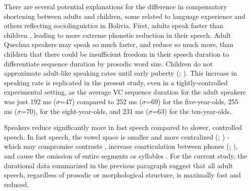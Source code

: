 \documentclass[a4paper,man,floatsintext,natbib,donotrepeattitle, apacite]{apa6}
\begin{document}
There are several potential explanations for the difference in compensatory shortening between adults and children, some related to language experience and others reflecting sociolinguistics in Bolivia. First, adults speak faster than children \citep{leeAcousticsChildrenSpeech1999}, leading to more extreme phonetic reduction in their speech. Adult Quechua speakers may speak so much faster, and reduce so much more, than children that there could be insufficient freedom in their speech duration to differentiate sequence duration by prosodic word size. Children do not approximate adult-like speaking rates until early puberty (\citealt{leeAcousticsChildrenSpeech1999}; \citealt{smithRelationshipsDurationTemporal1992}). This increase in speaking rate is replicated in the present study, even in a tightly-controlled experimental setting, as the average VC sequence duration for the adult speakers was just 192 ms ($\sigma$=47) compared to 252 ms ($\sigma$=69) for the five-year-olds, 255 ms ($\sigma$=70), for the eight-year-olds, and 231 ms ($\sigma$=63) for the ten-year-olds. 

Speakers reduce significantly more in fast speech compared to slower, controlled speech. In fast speech, the vowel space is smaller and more centralized (\citealt{fourakisTempoStressVowel1991}; \citealt{tsaoEffectIntertalkerSpeech2006}) - which may compromise contrasts \citep{koopmans-vanbeinumVowelContrastReduction1980}, increase coarticulation between phones (\citealt{agwueleEffectSpeakingRate2008}; \citealt{matthiesVariationAnticipatoryCoarticulation2001}), and cause the omission of entire segments or syllables \citep{johnsonMassiveReductionConversational2004}. For the current study, the durational data summarized in the previous paragraph suggest that all adult speech, regardless of prosodic or morphological structure, is maximally fast and reduced.  
\end{document}
